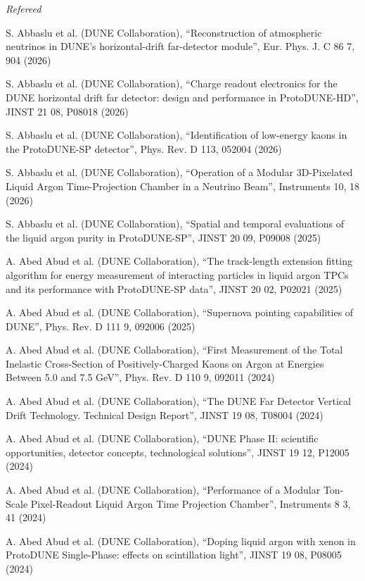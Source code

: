 {\it Refereed}
\begin{list2}
\item S. Abbaslu et al. (DUNE Collaboration), ``Reconstruction of atmospheric neutrinos in DUNE's horizontal-drift far-detector module'', Eur. Phys. J. C 86 7, 904 (2026)
\item S. Abbaslu et al. (DUNE Collaboration), ``Charge readout electronics for the DUNE horizontal drift far detector: design and performance in ProtoDUNE-HD'', JINST 21 08, P08018 (2026)
\item S. Abbaslu et al. (DUNE Collaboration), ``Identification of low-energy kaons in the ProtoDUNE-SP detector'', Phys. Rev. D 113, 052004 (2026)
\item S. Abbaslu et al. (DUNE Collaboration), ``Operation of a Modular 3D-Pixelated Liquid Argon Time-Projection Chamber in a Neutrino Beam'', Instruments 10, 18 (2026)
\item S. Abbaslu et al. (DUNE Collaboration), ``Spatial and temporal evaluations of the liquid argon purity in ProtoDUNE-SP'', JINST 20 09, P09008 (2025)
\item A. Abed Abud et al. (DUNE Collaboration), ``The track-length extension fitting algorithm for energy measurement of interacting particles in liquid argon TPCs and its performance with ProtoDUNE-SP data'', JINST 20 02, P02021 (2025)
\item A. Abed Abud et al. (DUNE Collaboration), ``Supernova pointing capabilities of DUNE'', Phys. Rev. D 111 9, 092006 (2025)
\item A. Abed Abud et al. (DUNE Collaboration), ``First Measurement of the Total Inelastic Cross-Section of Positively-Charged Kaons on Argon at Energies Between 5.0 and 7.5 GeV'', Phys. Rev. D 110 9, 092011 (2024)
\item A. Abed Abud et al. (DUNE Collaboration), ``The DUNE Far Detector Vertical Drift Technology. Technical Design Report'', JINST 19 08, T08004 (2024)
\item A. Abed Abud et al. (DUNE Collaboration), ``DUNE Phase II: scientific opportunities, detector concepts, technological solutions'', JINST 19 12, P12005 (2024)
\item A. Abed Abud et al. (DUNE Collaboration), ``Performance of a Modular Ton-Scale Pixel-Readout Liquid Argon Time Projection Chamber'', Instruments 8 3, 41 (2024)
\item A. Abed Abud et al. (DUNE Collaboration), ``Doping liquid argon with xenon in ProtoDUNE Single-Phase: effects on scintillation light'', JINST 19 08, P08005 (2024)

\end{list2}
